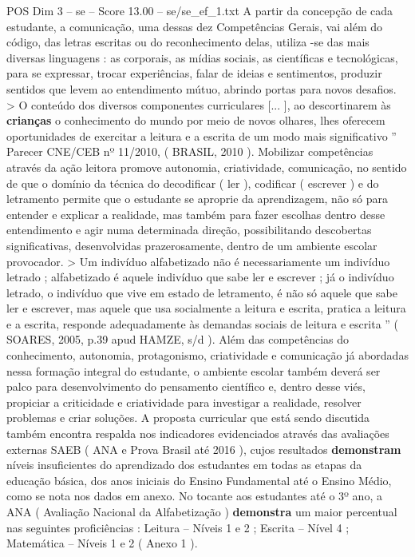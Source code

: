 \begin{textsample}{POS Dim 3 – se – Score 13.00 – se/se\_ef\_1.txt}
A partir da concepção de cada estudante, a comunicação, uma dessas dez Competências Gerais, vai além do código, das letras escritas ou do reconhecimento delas, utiliza -se das mais diversas linguagens : as corporais, as mídias sociais, as científicas e tecnológicas, para se expressar, trocar experiências, falar de ideias e sentimentos, produzir sentidos que levem ao entendimento mútuo, abrindo portas para novos desafios. > O conteúdo dos diversos componentes curriculares [... ], ao descortinarem às \textbf{crianças} o conhecimento do mundo por meio de novos olhares, lhes oferecem oportunidades de exercitar a leitura e a escrita de um modo mais significativo ” Parecer CNE/CEB nº 11/2010, ( BRASIL, 2010 ).
Mobilizar competências através da ação leitora promove autonomia, criatividade, comunicação, no sentido de que o domínio da técnica do decodificar ( ler ), codificar ( escrever ) e do letramento permite que o estudante se aproprie da aprendizagem, não só para entender e explicar a realidade, mas também para fazer escolhas dentro desse entendimento e agir numa determinada direção, possibilitando descobertas significativas, desenvolvidas prazerosamente, dentro de um ambiente escolar provocador. > Um indivíduo alfabetizado não é necessariamente um indivíduo letrado ; alfabetizado é aquele indivíduo que sabe ler e escrever ; já o indivíduo letrado, o indivíduo que vive em estado de letramento, é não só aquele que sabe ler e escrever, mas aquele que usa socialmente a leitura e escrita, pratica a leitura e a escrita, responde adequadamente às demandas sociais de leitura e escrita ” ( SOARES, 2005, p.39 apud HAMZE, s/d ).
Além das competências do conhecimento, autonomia, protagonismo, criatividade e comunicação já abordadas nessa formação integral do estudante, o ambiente escolar também deverá ser palco para desenvolvimento do pensamento científico e, dentro desse viés, propiciar a criticidade e criatividade para investigar a realidade, resolver problemas e criar soluções.
A proposta curricular que está sendo discutida também encontra respalda nos indicadores evidenciados através das avaliações externas SAEB ( ANA e Prova Brasil até 2016 ), cujos resultados \textbf{demonstram} níveis insuficientes do aprendizado dos estudantes em todas as etapas da educação básica, dos anos iniciais do Ensino Fundamental até o Ensino Médio, como se nota nos dados em anexo.
No tocante aos estudantes até o 3º ano, a ANA ( Avaliação Nacional da Alfabetização ) \textbf{demonstra} um maior percentual nas seguintes proficiências : Leitura – Níveis 1 e 2 ; Escrita – Nível 4 ; Matemática – Níveis 1 e 2 ( Anexo 1 ).

\end{textsample}
